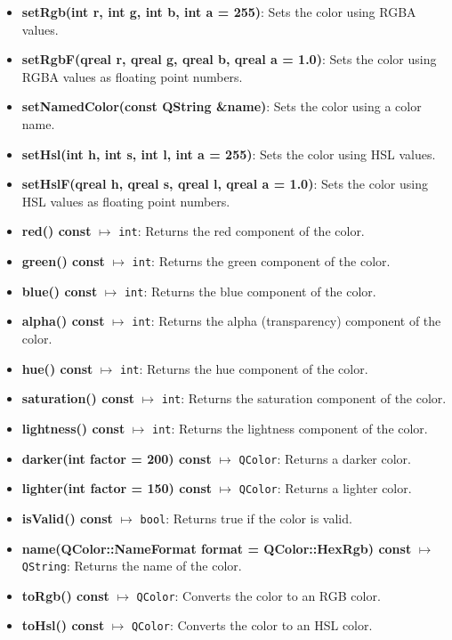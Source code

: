 \documentclass{report}
\begin{document}
    \pagebreak 
    \begin{itemize}
        \item \textbf{setRgb(int r, int g, int b, int a = 255)}: Sets the color using RGBA values.
        \item \textbf{setRgbF(qreal r, qreal g, qreal b, qreal a = 1.0)}: Sets the color using RGBA values as floating point numbers.
        \item \textbf{setNamedColor(const QString \&name)}: Sets the color using a color name.
        \item \textbf{setHsl(int h, int s, int l, int a = 255)}: Sets the color using HSL values.
        \item \textbf{setHslF(qreal h, qreal s, qreal l, qreal a = 1.0)}: Sets the color using HSL values as floating point numbers.
        \item \textbf{red() const} $\mapsto$ \texttt{int}: Returns the red component of the color.
        \item \textbf{green() const} $\mapsto$ \texttt{int}: Returns the green component of the color.
        \item \textbf{blue() const} $\mapsto$ \texttt{int}: Returns the blue component of the color.
        \item \textbf{alpha() const} $\mapsto$ \texttt{int}: Returns the alpha (transparency) component of the color.
        \item \textbf{hue() const} $\mapsto$ \texttt{int}: Returns the hue component of the color.
        \item \textbf{saturation() const} $\mapsto$ \texttt{int}: Returns the saturation component of the color.
        \item \textbf{lightness() const} $\mapsto$ \texttt{int}: Returns the lightness component of the color.
        \item \textbf{darker(int factor = 200) const} $\mapsto$ \texttt{QColor}: Returns a darker color.
        \item \textbf{lighter(int factor = 150) const} $\mapsto$ \texttt{QColor}: Returns a lighter color.
        \item \textbf{isValid() const} $\mapsto$ \texttt{bool}: Returns true if the color is valid.
        \item \textbf{name(QColor::NameFormat format = QColor::HexRgb) const} $\mapsto$ \texttt{QString}: Returns the name of the color.
        \item \textbf{toRgb() const} $\mapsto$ \texttt{QColor}: Converts the color to an RGB color.
        \item \textbf{toHsl() const} $\mapsto$ \texttt{QColor}: Converts the color to an HSL color.
    \end{itemize}
\end{document}
